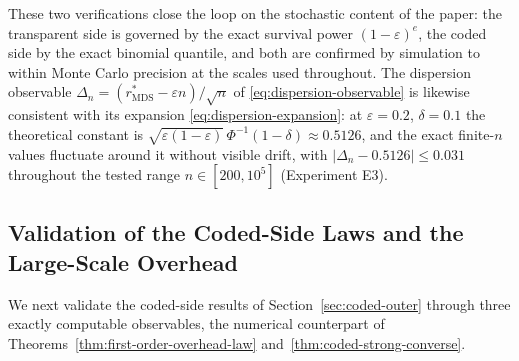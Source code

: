 \documentclass[journal]{IEEEtran}
\numberwithin{equation}{section}
\begin{document}
These two verifications close the loop on the stochastic content of the
paper: the transparent side is governed by the exact survival power
\((1-\varepsilon)^{e}\), the coded side by the exact binomial quantile, and
both are confirmed by simulation to within Monte Carlo precision at the
scales used throughout.  The dispersion observable
\(\Delta_n=(r_{\mathrm{MDS}}^{*}-\varepsilon n)/\sqrt n\) of
\eqref{eq:dispersion-observable} is likewise consistent with its expansion
\eqref{eq:dispersion-expansion}: at \(\varepsilon=0.2\), \(\delta=0.1\)
the theoretical constant is
\(\sqrt{\varepsilon(1-\varepsilon)}\,\Phi^{-1}(1-\delta)\approx 0.5126\),
and the exact finite-\(n\) values fluctuate around it without visible
drift, with \(|\Delta_n-0.5126|\le0.031\) throughout the tested range
\(n\in[200,10^{5}]\) (Experiment E3).

\subsection{Validation of the Coded-Side Laws and the Large-Scale Overhead}
\label{subsec:numerical-coded-validation}

We next validate the coded-side results of Section~\ref{sec:coded-outer}
through three exactly computable observables, the numerical counterpart of
Theorems~\ref{thm:first-order-overhead-law}
and~\ref{thm:coded-strong-converse}.
\end{document}

